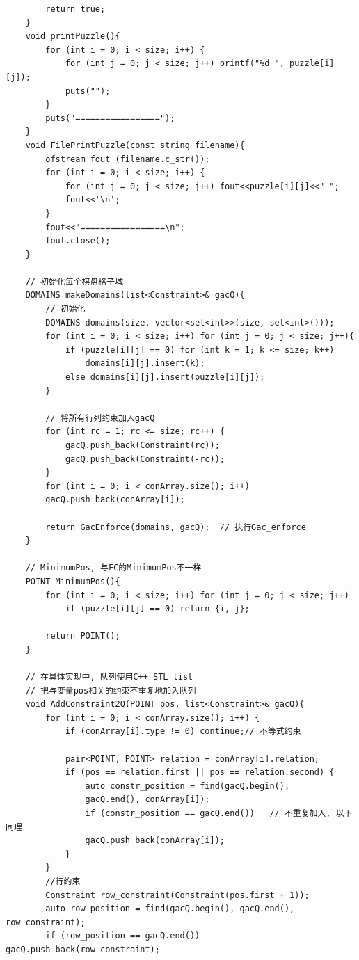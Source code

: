 \documentclass{article}
\begin{document}
\begin{lstlisting}
        return true;
    }
    void printPuzzle(){
        for (int i = 0; i < size; i++) {
            for (int j = 0; j < size; j++) printf("%d ", puzzle[i][j]);
            puts("");
        }
        puts("=================");
    }
    void FilePrintPuzzle(const string filename){
        ofstream fout (filename.c_str());
        for (int i = 0; i < size; i++) {
            for (int j = 0; j < size; j++) fout<<puzzle[i][j]<<" ";
            fout<<'\n';
        }
        fout<<"=================\n";
        fout.close();
    }
    
    // 初始化每个棋盘格子域
    DOMAINS makeDomains(list<Constraint>& gacQ){
        // 初始化
        DOMAINS domains(size, vector<set<int>>(size, set<int>()));
        for (int i = 0; i < size; i++) for (int j = 0; j < size; j++){
            if (puzzle[i][j] == 0) for (int k = 1; k <= size; k++) 
            	domains[i][j].insert(k); 
            else domains[i][j].insert(puzzle[i][j]);
        }
        
        // 将所有行列约束加入gacQ
        for (int rc = 1; rc <= size; rc++) {
            gacQ.push_back(Constraint(rc));   
            gacQ.push_back(Constraint(-rc)); 
        }
        for (int i = 0; i < conArray.size(); i++) 
        gacQ.push_back(conArray[i]);
        
        return GacEnforce(domains, gacQ);  // 执行Gac_enforce
    }
    
    // MinimumPos, 与FC的MinimumPos不一样
    POINT MinimumPos(){
        for (int i = 0; i < size; i++) for (int j = 0; j < size; j++)
        	if (puzzle[i][j] == 0) return {i, j};
        
        return POINT();
    }
    
    // 在具体实现中, 队列使用C++ STL list
    // 把与变量pos相关的约束不重复地加入队列
    void AddConstraint2Q(POINT pos, list<Constraint>& gacQ){
        for (int i = 0; i < conArray.size(); i++) {
            if (conArray[i].type != 0) continue;// 不等式约束
            
            pair<POINT, POINT> relation = conArray[i].relation;
            if (pos == relation.first || pos == relation.second) {
                auto constr_position = find(gacQ.begin(), 
                gacQ.end(), conArray[i]);
                if (constr_position == gacQ.end())   // 不重复加入, 以下同理
                gacQ.push_back(conArray[i]);
            }
        }
        //行约束
        Constraint row_constraint(Constraint(pos.first + 1));
        auto row_position = find(gacQ.begin(), gacQ.end(), row_constraint);
        if (row_position == gacQ.end()) gacQ.push_back(row_constraint);  
        

\end{lstlisting}
\end{document}
